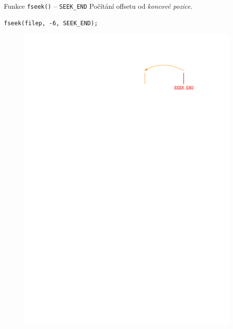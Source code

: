 \documentclass[14pt,aspectratio=169]{beamer}
\begin{document}
    \begin{frame}{Funkce \texttt{fseek()} -- \texttt{SEEK\_END}}
        Počítání offsetu od \emph{koncové pozice}.
        \begin{center}
            \texttt{fseek(filep, -6, SEEK\_END);}
        \end{center}
        \begin{figure}
            \centering
            \includegraphics[scale=1]{images/cursor_fseek4.pdf}
        \end{figure}
    \end{frame}
\end{document}
